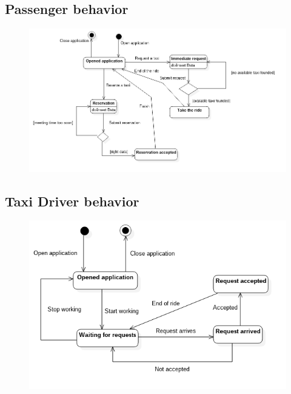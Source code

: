 \subsection{Passenger behavior}
\begin{figure}[H]
\centering
\includegraphics[scale=0.5]{Images/statechart_passenger}
\end{figure}
\subsection{Taxi Driver behavior}
\begin{figure}[H]
\centering
\includegraphics[scale=0.5]{Images/statechart_taxiDriver}
\end{figure}